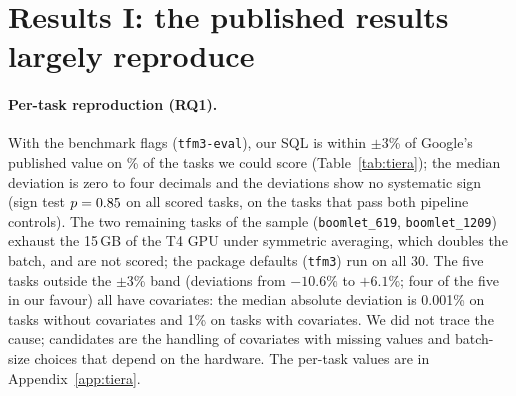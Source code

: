 \section{Results I: the published results largely reproduce}
\label{sec:reproduction}

\paragraph{Per-task reproduction (RQ1).} With the benchmark flags (\texttt{tfm3-eval}), our SQL is within $\pm$3\% of Google's
published value on \AReproShare\% of the \ATasks{} tasks we could score (Table~\ref{tab:tiera}); the median deviation is zero to four
decimals and the deviations show no systematic sign (sign test $p = 0.85{}$ on all scored tasks, \ASignPCtl{} on the
\AControlTasks{} tasks that pass both pipeline controls). The two remaining tasks of the sample (\texttt{boomlet\_619},
\texttt{boomlet\_1209}) exhaust the 15\,GB of the T4 GPU under symmetric averaging, which doubles the batch, and are not scored;
the package defaults (\texttt{tfm3}) run on all 30. The five tasks outside the $\pm$3\% band (deviations from $-10.6\%$ to
$+6.1\%$; four of the five in our favour) all have covariates: the median absolute deviation is 0.001\% on tasks without covariates
and 1\% on tasks with covariates. We did not trace the cause; candidates are the handling of covariates with missing values and
batch-size choices that depend on the hardware. The per-task values are in Appendix~\ref{app:tiera}.

\begin{table}[!htbp]
\centering
\caption{Tier A: reproduction of Google's published fev-bench results. ``$\pm$3\%'': share of tasks whose SQL is within 3\%
of the published value; ``Median'' and ``Range'': deviations relative to the published SQL. ``Ratio'': geometric mean over tasks of SQL(TimesFM~3) /
SQL(Chronos-2), with our Chronos-2 (``ours'', no cross-learning) or fev's published Chronos-2 (``publ.'', cross-learning).}
\label{tab:tiera}
\scriptsize
\setlength{\tabcolsep}{3.5pt}

\end{table}

